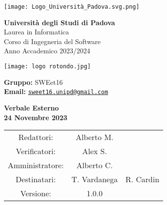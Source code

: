 \documentclass[a4paper, 11pt]{article}
\begin{document}
\begin{minipage}{0.35\linewidth}
    \texttt{[image: Logo\_Università\_Padova.svg.png]}
\end{minipage}\hfil
\begin{minipage}{0.55\linewidth}
\textbf{Università degli Studi di Padova} \\
Laurea in Informatica \\
Corso di Ingegneria del Software \\
Anno Accademico 2023/2024
\end{minipage}

\vspace{5mm}

\begin{minipage}{0.35\linewidth}
    \texttt{[image: logo rotondo.jpg]}
\end{minipage}\hfil
\begin{minipage}{0.55\linewidth}
\textbf{Gruppo:} SWEet16 \\
\textbf{Email:} 
\href{mailto:sweet16.unipd@gmail.com}{\nolinkurl{sweet16.unipd@gmail.com}}
\end{minipage}

\vspace{15mm}

\begin{center}
\begin{Huge}
        \textbf{Verbale Esterno} \\
        \vspace{4mm}
        \textbf{24 Novembre 2023}
\end{Huge}

\vspace{20mm}

\begin{large}
\begin{spacing}{1.4}
\begin{tabular}{c c c}
   Redattori:  &  Alberto M. & \\
   Verificatori: & Alex S. & \\
   Amministratore: &  Alberto C. & \\
   Destinatari: & T. Vardanega & R. Cardin \\  
   Versione: & 1.0.0 & 
\end{tabular}
\end{spacing}
\end{large}
\end{center}

\pagebreak
\end{document}
